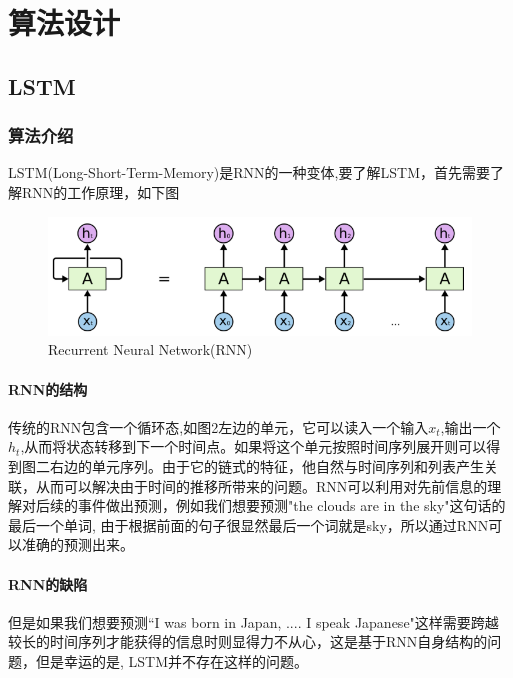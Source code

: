 \documentclass[UTF8]{ctexart}
\begin{document}
\section{算法设计}
\subsection{LSTM}
\subsubsection{算法介绍}
LSTM(Long-Short-Term-Memory)是RNN的一种变体,要了解LSTM，首先需要了解RNN的工作原理，如下图
\begin{figure}[!htbp]
\centering
\includegraphics[scale = 0.8]{p3.png}
\caption{Recurrent Neural Network(RNN)\cite{1}}
\end{figure}
\paragraph*{RNN的结构}
传统的RNN包含一个循环态,如图2左边的单元，它可以读入一个输入$x_t$,输出一个$h_t$,从而将状态转移到下一个时间点。如果将这个单元按照时间序列展开则可以得到图二右边的单元序列。由于它的链式的特征，他自然与时间序列和列表产生关联，从而可以解决由于时间的推移所带来的问题。RNN可以利用对先前信息的理解对后续的事件做出预测，例如我们想要预测"the clouds are in the sky"这句话的最后一个单词, 由于根据前面的句子很显然最后一个词就是sky，所以通过RNN可以准确的预测出来。
\paragraph*{RNN的缺陷}
但是如果我们想要预测“I was born in Japan, .... I speak Japanese"这样需要跨越较长的时间序列才能获得的信息时则显得力不从心，这是基于RNN自身结构的问题，但是幸运的是, LSTM并不存在这样的问题。
\end{document}
